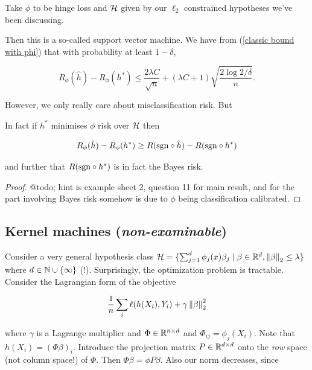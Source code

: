 \documentclass[11pt]{scrartcl}
\begin{document}
\begin{example}
\label{SVM theory}
Take $\phi$ to be hinge loss and $\mathcal{H}$ given by our $\ell_2$ constrained hypotheses we've been discussing.

Then this is a so-called support vector machine. We have from (\ref{classic bound with phi}) that with probability at least $1 - \delta$,

\begin{equation}
    R_\phi(\hat{h}) - R_\phi(h^*) \le \frac{2 \lambda C}{\sqrt{n}} + (\lambda C + 1) \sqrt{\frac{2 \log 2/\delta}{n}}.
\end{equation}
\end{example}

However, we only really care about misclassification risk. But

\begin{theorem}

In fact if $h^*$ minimises $\phi$ risk over $\mathcal{H}$ then

\begin{equation}
    R_\phi(\hat{h}) - R_\phi(h^*) \ge R(\text{sgn} \circ \hat{h}) - R(\text{sgn} \circ h^*)
\end{equation}

and further that $R(\text{sgn} \circ h^*)$ is in fact the Bayes risk.

\begin{proof}
@todo; hint is example sheet 2, question 11 for main result, and for the part involving Bayes risk somehow  is due to $\phi$ being classification calibrated.
\end{proof}
\end{theorem}

\subsection{Kernel machines (\textit{non-examinable})}

Consider a very general hypothesis class $\mathcal{H} = \{ \sum_{j=1}^d \phi_j(x) \beta_j \mid \beta \in \mathbb R^d, \left\lVert\beta\right\rVert_2 \le \lambda \}$ where $d \in \mathbb N \cup \{ \infty \}$ (!). Surprisingly, the optimization problem is tractable. Consider the Lagrangian form of the objective

\begin{equation}
    \frac1n \sum_{i} \ell(h(X_i), Y_i) + \gamma \left\lVert\beta\right\rVert_2^2
\end{equation}

where $\gamma$ is a Lagrange multiplier and $\Phi \in \mathbb R^{n \times d}$ and $\Phi_{ij} = \phi_j(X_i)$. Note that $h(X_i) = (\Phi \beta)_i$. Introduce the projection matrix $P\in \mathbb R^{d \times d}$ onto the \emph{row} space (not column space!) of $\Phi$. Then $\Phi \beta = \phi P \beta$. Also our norm decreases, since 
\end{document}
